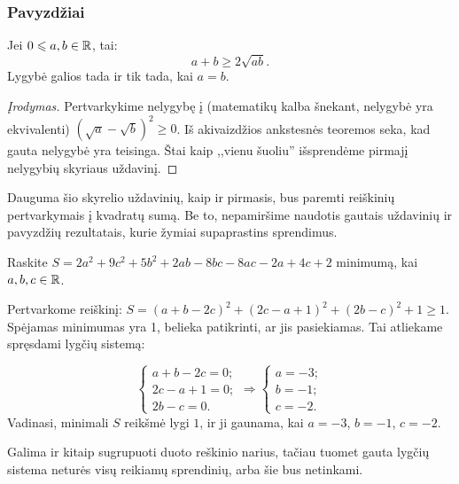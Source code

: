 \subsubsection{Pavyzdžiai}

\begin{pavnr}
  Jei $0\leqslant a,b\in\mathbb R$, tai: $$a+b\geq2\sqrt{ab}.$$ Lygybė galios tada ir tik
  tada, kai $a=b$.
\end{pavnr}

\begin{proof}[Įrodymas]
  Pertvarkykime nelygybę į (matematikų kalba šnekant, nelygybė yra
  ekvivalenti) $(\sqrt{a}-\sqrt{b})^2\geq0$. Iš akivaizdžios ankstesnės
  teoremos seka, kad gauta nelygybė yra teisinga. Štai kaip
  ,,vienu šuoliu'' išsprendėme pirmajį nelygybių skyriaus uždavinį.
\end{proof}

Dauguma šio skyrelio uždavinių, kaip ir pirmasis, bus paremti reiškinių
pertvarkymais į kvadratų sumą. Be to, nepamiršime naudotis gautais
uždavinių ir pavyzdžių rezultatais, kurie žymiai supaprastins sprendimus.

\begin{pavnr}
  Raskite $S=2a^2+9c^2+5b^2+2ab-8bc-8ac-2a+4c+2$ minimumą, kai $a,b,c\in\mathbb R$.
\end{pavnr}

\begin{sprendimas}
  Pertvarkome reiškinį: $S=(a+b-2c)^2+(2c-a+1)^2+(2b-c)^2+1\geq1$. Spėjamas
  minimumas yra 1, belieka patikrinti, ar jis pasiekiamas. Tai atliekame
  spręsdami lygčių sistemą:

  $$\left\{\begin{array}{lr}
  a+b-2c=0;\\
  2c-a+1=0;\\
  2b-c=0.\end{array}\right.
  \Rightarrow
  \left\{\begin{array}{lr}
  a=-3;\\
  b=-1;\\
  c=-2.\end{array}\right. $$
  Vadinasi, minimali $S$ reikšmė lygi $1$, ir ji gaunama, kai $a=-3$,
  $b=-1$, $c=-2$.
\end{sprendimas}

\begin{pastaba}
  Galima ir kitaip sugrupuoti duoto reškinio narius, tačiau tuomet gauta
  lygčių sistema neturės visų reikiamų sprendinių, arba šie bus netinkami.
\end{pastaba}

